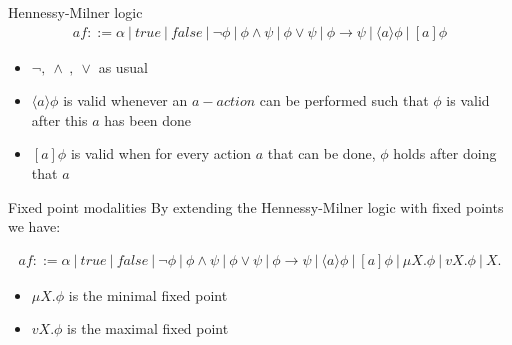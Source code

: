 \documentclass{beamer}
\begin{document}
  \begin{frame}{Hennessy-Milner logic}
    \begin{align*}
      af ::= \alpha\ |\ true\ |\ false\ |\ \neg \phi\ |\ \phi \land \psi\ |\ \phi \lor \psi\ |\ \phi \to \psi\ |\ \langle a \rangle \phi \ |\ [a]\phi
    \end{align*}
    \begin{itemize}
      \item $\neg ,\ \land\ ,\ \lor$ as usual
      \item $\langle a \rangle \phi$ is valid whenever an $a-action$ can be performed such that $\phi$ is valid after this $a$ has been done
      \item $[a]\phi$ is valid when for every action $a$ that can be done, $\phi$ holds after doing that $a$
    \end{itemize}
  \end{frame}

  \begin{frame}{Fixed point modalities}
    By extending the Hennessy-Milner logic with fixed points we have:
    \resizebox{ \textwidth}{!} {
      \begin{minipage}{\textwidth}
        \begin{align*}
          af ::= \alpha\ |\ true\ |\ false\ |\ \neg \phi\ |\ \phi \land \psi\ |\ \phi \lor \psi\ |\ \phi \to \psi\ |\ \langle a \rangle \phi \ |\ [a]\phi\ |\ \mu X. \phi \ |\ vX. \phi \ |\ X.
        \end{align*}
      \end{minipage}
    }
    \begin{itemize}
      \item $\mu X. \phi$ is the minimal fixed point
      \item $vX. \phi$ is the maximal fixed point
    \end{itemize}
  \end{frame}
\end{document}
